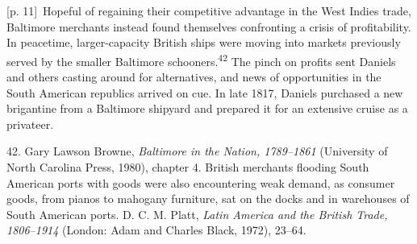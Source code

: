 \documentclass[10pt,a4paper]{article}
\begin{document}
{\scriptsize\color{gray} [p. 11]}\ Hopeful of regaining their competitive advantage in the West Indies trade, Baltimore merchants instead found themselves confronting a crisis of profitability. In peacetime, larger-capacity British ships were moving into markets previously served by the smaller Baltimore schooners.\nobreak\textsuperscript{42} The pinch on profits sent Daniels and others casting around for alternatives, and news of opportunities in the South American republics arrived on cue. In late 1817, Daniels purchased a new brigantine from a Baltimore shipyard and prepared it for an extensive cruise as a privateer.\par{\small 42. Gary Lawson Browne, \textit{Baltimore in the Nation, 1789–1861} (University of North Carolina Press, 1980), chapter 4. British merchants flooding South American ports with goods were also encountering weak demand, as consumer goods, from pianos to mahogany furniture, sat on the docks and in warehouses of South American ports. D. C. M. Platt, \textit{Latin America and the British Trade, 1806–1914} (London: Adam and Charles Black, 1972), 23–64.\par}
\end{document}
